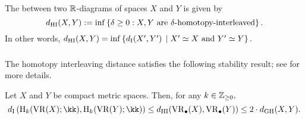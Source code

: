 The  between two $\mathbb{R}$-diagrams of spaces $X$ and $Y$ is given by
\[
d_{\mathrm{HI}}(X,Y):=\inf \left\{\delta\geq 0:X,Y \text{ are }\delta\text{-homotopy-interleaved}\right\}.
\]
In other words, $d_{\mathrm{HI}}(X,Y) = \inf\left\{d_{\mathrm{I}}(X',Y')\,\mid X'\simeq X\text{ and }Y'\simeq Y\right\}.$

\subsubsection{}\label{thm:stability-HI} The homotopy interleaving distance satisfies the following stability result; see \cite[Prop.~1.9 \& Thm.~1.10]{blumberg2023interleaving} for more details.

\medskip\theorem Let $X$ and $Y$ be compact metric spaces. Then, for any $k\in \mathbb{Z}_{\geq 0},$
\[
\di \left(\rH_k(\VR(X); \kk), \rH_k(\VR(Y); \kk)\right) \leq  \dhi(  \VR_{\bullet}(X)  ,  \VR_{\bullet}(Y)  )\leq 2\cdot d_{\mathrm{GH}}(X, Y).
\]